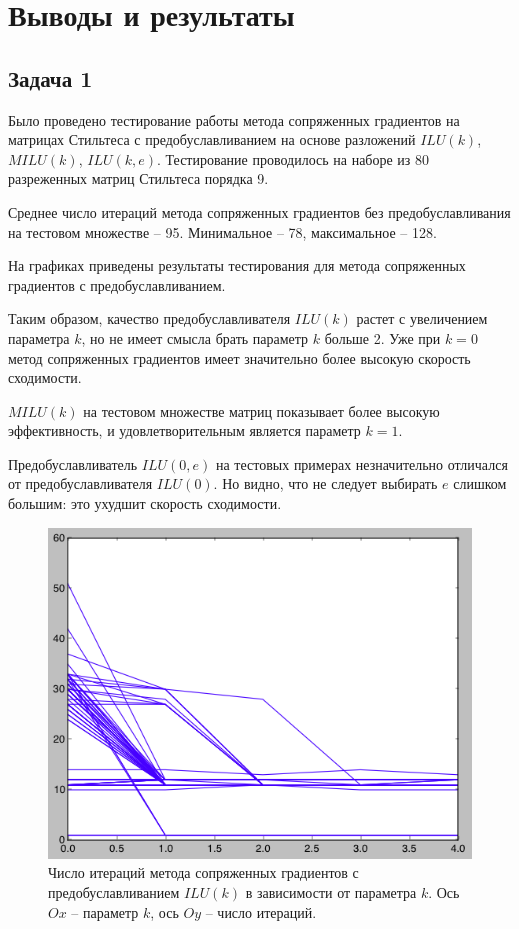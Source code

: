 \section{Выводы и результаты}
\subsection{Задача 1}
Было проведено тестирование работы метода сопряженных градиентов на матрицах Стильтеса с предобуславливанием на основе разложений $ILU(k)$, $MILU(k)$, $ILU(k, e)$. Тестирование проводилось на наборе из 80 разреженных матриц Стильтеса порядка 9.

Среднее число итераций метода сопряженных градиентов без предобуславливания на тестовом множестве – 95. Минимальное – 78, максимальное – 128.

На графиках приведены результаты тестирования для метода сопряженных градиентов с предобуславливанием.

Таким образом, качество предобуславливателя $ILU(k)$ растет с увеличением параметра $k$, но не имеет смысла брать параметр $k$ больше 2. Уже при $k=0$ метод сопряженных градиентов имеет значительно более высокую скорость сходимости.

$MILU(k)$ на тестовом множестве матриц показывает более высокую эффективность, и удовлетворительным является параметр $k=1$.
               
Предобуславливатель $ILU(0, e)$ на тестовых примерах незначительно отличался от предобуславливателя $ILU(0)$. Но видно, что не следует выбирать $e$ слишком большим: это ухудшит скорость сходимости.

\begin{figure}[ht]
\includegraphics[width=\textwidth,keepaspectratio]{ilu_k}
\caption{Число итераций метода сопряженных градиентов с предобуславливанием $ILU(k)$ в зависимости от параметра $k$. Ось $Ox$ – параметр $k$, ось $Oy$ – число итераций.}
\end{figure}

